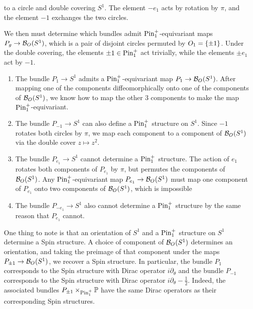 \begin{exmp}
\begin{enumerate}
  to a circle and double covering $S^1$. The element $-e_1$ acts by rotation by
  $\pi$, and the element $-1$ exchanges the two circles.
\end{enumerate}
%
We then must determine which bundles admit
$\mathrm{Pin}_1^+$-equivariant maps $P_g \to \mathcal{B}_O(S^1)$, which is a pair of disjoint
circles permuted by $O_1 = \left\lbrace \pm 1 \right\rbrace$. Under the double covering, the
elements $\pm 1 \in \mathrm{Pin}_1^+$ act trivially, while the elements $\pm e_1$ act by $-1$.
%
\begin{enumerate}
  \item The bundle $P_1 \to S^1$ admits a $\mathrm{Pin}_1^+$-equivariant map
  $P_1 \to \mathcal{B}_O(S^1)$. After mapping one of the components diffeomorphically
  onto one of the components of $\mathcal{B}_O(S^1)$, we know how to map
  the other $3$ components to make the map $\mathrm{Pin}_1^+$-equivariant.
  \item The bundle $P_{-1} \to S^1$ can also define a $\mathrm{Pin}_1^+$ structure on
  $S^1$. Since $-1$ rotates both circles by $\pi$, we map each component to
  a component of $\mathcal{B}_O(S^1)$ via the double cover $z \mapsto z^2$.
  \item The bundle $P_{e_1} \to S^1$ cannot determine a $\mathrm{Pin}^+_1$ structure.
  The action of $e_1$ rotates both components of $P_{e_1}$ by $\pi$, but
  permutes the components of $\mathcal{B}_O(S^1)$. Any $\mathrm{Pin}_1^+$-equivariant map
  $P_{e_1} \to \mathcal{B}_O(S^1)$ must map one component of $P_{e_1}$ onto two
  components of $\mathcal{B}_O(S^1)$, which is impossible
  \item The bundle $P_{-e_1} \to S^1$ also cannot determine a $\mathrm{Pin}_1^+$
  structure by the same reason that $P_{e_1}$ cannot.
\end{enumerate}
%
One thing to note is that an orientation of $S^1$ and a $\mathrm{Pin}_1^+$ structure
on $S^1$ determine a Spin structure. A choice of component of $\mathcal{B}_O(S^1)$
determines an orientation, and taking the preimage of that component
under the maps $P_{\pm 1} \to \mathcal{B}_O(S^1)$, we recover a Spin structure. In
particular, the bundle $P_1$ corresponds to the Spin structure with Dirac operator
$i\partial_\theta$ and the bundle $P_{-1}$ corresponds to the Spin structure
with Dirac operator $i\partial_\theta - \frac{1}{2}$.  Indeed, the associated
bundles $P_{\pm 1} \times_{\mathrm{Pin}_1^+} \mathbb{P}$ have the same Dirac operators as
their corresponding Spin structures.\\


\end{exmp}
